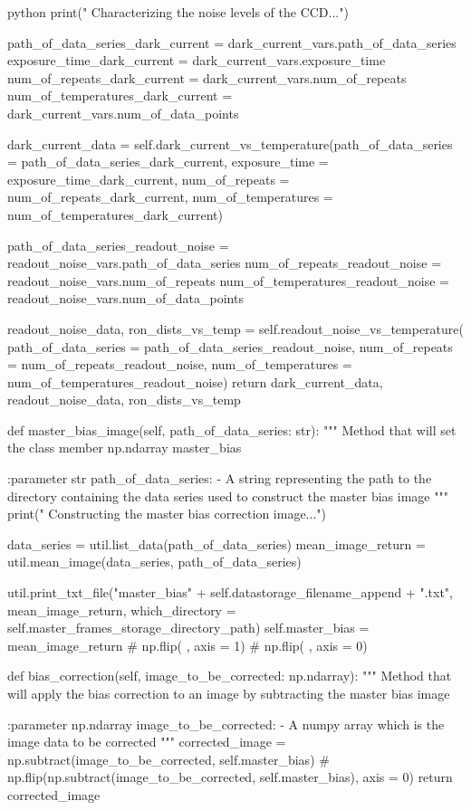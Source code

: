 \documentclass[../main.tex]{subfiles}
\begin{document}
\begin{mintedbox}{python}
print(" Characterizing the noise levels of the CCD...")

path_of_data_series_dark_current  =  dark_current_vars.path_of_data_series
exposure_time_dark_current  =  dark_current_vars.exposure_time
num_of_repeats_dark_current  =  dark_current_vars.num_of_repeats
num_of_temperatures_dark_current  =  dark_current_vars.num_of_data_points

dark_current_data  =  self.dark_current_vs_temperature(path_of_data_series = path_of_data_series_dark_current,
exposure_time = exposure_time_dark_current,
num_of_repeats = num_of_repeats_dark_current,
num_of_temperatures = num_of_temperatures_dark_current)

path_of_data_series_readout_noise  =  readout_noise_vars.path_of_data_series
num_of_repeats_readout_noise  =  readout_noise_vars.num_of_repeats
num_of_temperatures_readout_noise  =  readout_noise_vars.num_of_data_points

readout_noise_data, ron_dists_vs_temp  =  self.readout_noise_vs_temperature(
path_of_data_series = path_of_data_series_readout_noise,
num_of_repeats = num_of_repeats_readout_noise,
num_of_temperatures = num_of_temperatures_readout_noise)
return dark_current_data, readout_noise_data, ron_dists_vs_temp

def master_bias_image(self, path_of_data_series: str):
"""
Method that will set the class member np.ndarray master_bias

:parameter str path_of_data_series:
- A string representing the path to the directory
containing the data series used to construct the
master bias image
"""
print(" Constructing the master bias correction image...")

data_series  =  util.list_data(path_of_data_series)
mean_image_return  =  util.mean_image(data_series, path_of_data_series)

util.print_txt_file("master_bias" + self.datastorage_filename_append + ".txt", mean_image_return,
which_directory = self.master_frames_storage_directory_path)
self.master_bias  =  mean_image_return  # np.flip( , axis  =  1)  # np.flip( , axis  =  0)

def bias_correction(self, image_to_be_corrected: np.ndarray):
"""
Method that will apply the bias correction to an image
by subtracting the master bias image

:parameter np.ndarray image_to_be_corrected:
- A numpy array which is the image data to be corrected
"""
corrected_image  =  np.subtract(image_to_be_corrected,
self.master_bias)  # np.flip(np.subtract(image_to_be_corrected, self.master_bias), axis = 0)
return corrected_image


\end{mintedbox}
\end{document}

